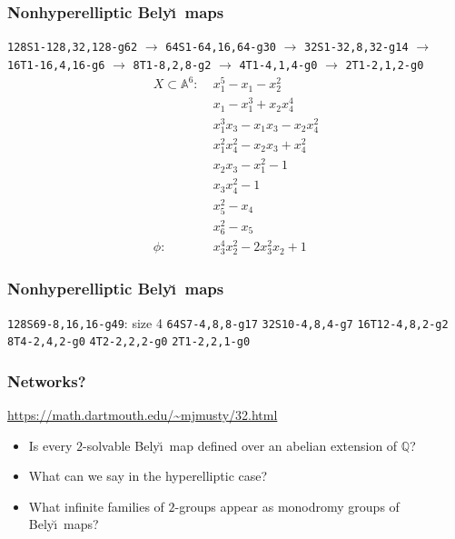\documentclass[xcolor=dvipsnames]{beamer}
\theoremstyle{plain}
\newcommand{\A}{\mathbb A}
\newcommand{\Q}{\mathbb Q}
\newcommand{\Belyi}{Bely\u{\i}}
\begin{document}
  \begin{frame}[plain]
    \frametitle{Nonhyperelliptic \Belyi\ maps}
    \pause
    \texttt{128S1-128,32,128-g62}
    $\to$
    \texttt{64S1-64,16,64-g30}
    $\to$
    \texttt{32S1-32,8,32-g14}
    $\to$
    \texttt{16T1-16,4,16-g6}
    $\to$
    \texttt{8T1-8,2,8-g2}
    $\to$
    \texttt{4T1-4,1,4-g0}
    $\to$
    \texttt{2T1-2,1,2-g0}
    \pause
    \begin{align*}
      X\subset\A^6:\;&x_1^5-x_1-x_2^2\\
         &x_1-x_1^3+x_2x_4^4\\
         &x_1^3x_3-x_1x_3-x_2x_4^2\\
         &x_1^2x_4^2-x_2x_3+x_4^2\\
         &x_2x_3-x_1^2-1\\
         &x_3x_4^2-1\\
         &x_5^2-x_4\\
         &x_6^2-x_5\\
      \phi:\;&x_3^4x_2^2-2x_3^2x_2+1
    \end{align*}
  \end{frame}
  \begin{frame}[plain]
    \frametitle{Nonhyperelliptic \Belyi\ maps}
    \texttt{128S69-8,16,16-g49}: size 4
    \newline
    \texttt{64S7-4,8,8-g17}
    \newline
    \texttt{32S10-4,8,4-g7}
    \newline
    \texttt{16T12-4,8,2-g2}
    \newline
    \texttt{8T4-2,4,2-g0}
    \newline
    \texttt{4T2-2,2,2-g0}
    \newline
    \texttt{2T1-2,2,1-g0}
  \end{frame}
  \begin{frame}[plain]
    \frametitle{Networks?}
    \pause
    \url{https://math.dartmouth.edu/~mjmusty/32.html}
    \begin{itemize}
      \pause
      \item
        Is every $2$-solvable \Belyi\ map defined over an abelian extension of $\Q$?
      \pause
      \item
        What can we say in the hyperelliptic case?
      \pause
      \item
        What infinite families of $2$-groups appear as monodromy groups of \Belyi\ maps?
    \end{itemize}
  \end{frame}
\end{document}
